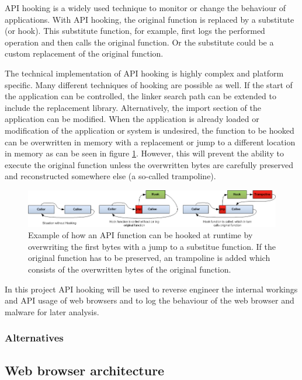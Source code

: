 API hooking is a widely used technique to monitor or change the behaviour of applications. With API hooking, the original function is replaced by a substitute (or hook). This substitute function, for example, first logs the performed operation and then calls the original function. Or the substitute could be a custom replacement of the original function.

The technical implementation of API hooking is highly complex and platform specific. Many different techniques\cite{jbremer2012} of hooking are possible as well. If the start of the application can be controlled, the linker search path can be extended to include the replacement library. Alternatively, the import section of the application can be modified. When the application is already loaded or modification of the application or system is undesired, the function to be hooked can be overwritten in memory with a replacement or jump to a different location in memory as can be seen in figure \ref{fig:apihooking}. However, this will prevent the ability to execute the original function unless the overwritten bytes are carefully preserved and reconstructed somewhere else (a so-called trampoline).

\begin{figure}
    \centering
    \includegraphics[width=14.7cm]{Images/API-hooking.png}
    \caption{Example of how an API function can be hooked at runtime by overwriting the first bytes with a jump to a substitue function. If the original function has to be preserved, an trampoline is added which consists of the overwritten bytes of the original function. \cite{APIHookImage}}
    \label{fig:apihooking}
\end{figure}

In this project API hooking will be used to reverse engineer the internal workings and API usage of web browsers and to log the behaviour of the web browser and malware for later analysis.

\subsubsection{Alternatives}



\subsection{Web browser architecture}


